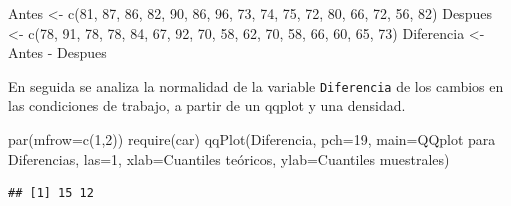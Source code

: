 \documentclass[
]{book}
\makeatletter
\newenvironment{Shaded}{\begin{snugshade}}{\end{snugshade}}
\newcommand{\AttributeTok}[1]{\textcolor[rgb]{0.77,0.63,0.00}{#1}}
\newcommand{\DecValTok}[1]{\textcolor[rgb]{0.00,0.00,0.81}{#1}}
\newcommand{\FunctionTok}[1]{\textcolor[rgb]{0.00,0.00,0.00}{#1}}
\newcommand{\NormalTok}[1]{#1}
\newcommand{\OtherTok}[1]{\textcolor[rgb]{0.56,0.35,0.01}{#1}}
\newcommand{\SpecialCharTok}[1]{\textcolor[rgb]{0.00,0.00,0.00}{#1}}
\newcommand{\StringTok}[1]{\textcolor[rgb]{0.31,0.60,0.02}{#1}}
\newenvironment{kframe}{%
\medskip{}
\setlength{\fboxsep}{.8em}
 \def\at@end@of@kframe{}%
 \ifinner\ifhmode%
  \def\at@end@of@kframe{\end{minipage}}%
  \begin{minipage}{\columnwidth}%
 \fi\fi%
 \def\FrameCommand##1{\hskip\@totalleftmargin \hskip-\fboxsep
 \colorbox{shadecolor}{##1}\hskip-\fboxsep
     \hskip-\linewidth \hskip-\@totalleftmargin \hskip\columnwidth}%
 \MakeFramed {\advance\hsize-\width
   \@totalleftmargin\z@ \linewidth\hsize
   \@setminipage}}%
 {\par\unskip\endMakeFramed%
 \at@end@of@kframe}
\renewenvironment{Shaded}{\begin{kframe}}{\end{kframe}}
\makeatother
\begin{document}
\begin{Shaded}
\begin{Highlighting}[]
\NormalTok{Antes   }\OtherTok{\textless{}{-}} \FunctionTok{c}\NormalTok{(}\DecValTok{81}\NormalTok{, }\DecValTok{87}\NormalTok{, }\DecValTok{86}\NormalTok{, }\DecValTok{82}\NormalTok{, }\DecValTok{90}\NormalTok{, }\DecValTok{86}\NormalTok{, }\DecValTok{96}\NormalTok{, }\DecValTok{73}\NormalTok{,}
             \DecValTok{74}\NormalTok{, }\DecValTok{75}\NormalTok{, }\DecValTok{72}\NormalTok{, }\DecValTok{80}\NormalTok{, }\DecValTok{66}\NormalTok{, }\DecValTok{72}\NormalTok{, }\DecValTok{56}\NormalTok{, }\DecValTok{82}\NormalTok{)}
\NormalTok{Despues }\OtherTok{\textless{}{-}} \FunctionTok{c}\NormalTok{(}\DecValTok{78}\NormalTok{, }\DecValTok{91}\NormalTok{, }\DecValTok{78}\NormalTok{, }\DecValTok{78}\NormalTok{, }\DecValTok{84}\NormalTok{, }\DecValTok{67}\NormalTok{, }\DecValTok{92}\NormalTok{, }\DecValTok{70}\NormalTok{,}
             \DecValTok{58}\NormalTok{, }\DecValTok{62}\NormalTok{, }\DecValTok{70}\NormalTok{, }\DecValTok{58}\NormalTok{, }\DecValTok{66}\NormalTok{, }\DecValTok{60}\NormalTok{, }\DecValTok{65}\NormalTok{, }\DecValTok{73}\NormalTok{)}
\NormalTok{Diferencia }\OtherTok{\textless{}{-}}\NormalTok{ Antes }\SpecialCharTok{{-}}\NormalTok{ Despues}
\end{Highlighting}
\end{Shaded}

En seguida se analiza la normalidad de la variable \texttt{Diferencia} de los cambios en las condiciones de trabajo, a partir de un qqplot y una densidad.

\begin{Shaded}
\begin{Highlighting}[]
\FunctionTok{par}\NormalTok{(}\AttributeTok{mfrow=}\FunctionTok{c}\NormalTok{(}\DecValTok{1}\NormalTok{,}\DecValTok{2}\NormalTok{))}
\FunctionTok{require}\NormalTok{(car)}
\FunctionTok{qqPlot}\NormalTok{(Diferencia, }\AttributeTok{pch=}\DecValTok{19}\NormalTok{, }\AttributeTok{main=}\StringTok{\textquotesingle{}QQplot para Diferencias\textquotesingle{}}\NormalTok{, }\AttributeTok{las=}\DecValTok{1}\NormalTok{, }
       \AttributeTok{xlab=}\StringTok{\textquotesingle{}Cuantiles teóricos\textquotesingle{}}\NormalTok{, }\AttributeTok{ylab=}\StringTok{\textquotesingle{}Cuantiles muestrales\textquotesingle{}}\NormalTok{)}
\end{Highlighting}
\end{Shaded}

\begin{verbatim}
## [1] 15 12
\end{verbatim}
\end{document}
